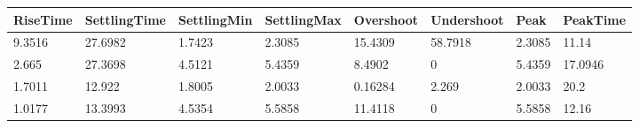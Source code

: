 \begin{tabular}{llllllll}
RiseTime & SettlingTime & SettlingMin & SettlingMax & Overshoot & Undershoot & Peak & PeakTime \\ 
\hline 
9.3516 & 27.6982 & 1.7423 & 2.3085 & 15.4309 & 58.7918 & 2.3085 & 11.14 \\ 
2.665 & 27.3698 & 4.5121 & 5.4359 & 8.4902 & 0 & 5.4359 & 17.0946 \\ 
1.7011 & 12.922 & 1.8005 & 2.0033 & 0.16284 & 2.269 & 2.0033 & 20.2 \\ 
1.0177 & 13.3993 & 4.5354 & 5.5858 & 11.4118 & 0 & 5.5858 & 12.16 \\ 
\hline 
\end{tabular}